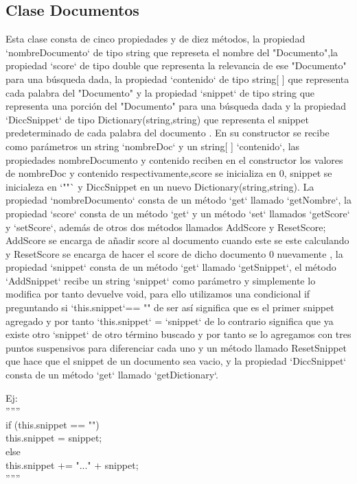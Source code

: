 \documentclass{article}
\begin{document}
\subsection{Clase Documentos}
Esta clase consta de cinco propiedades y de diez métodos, la propiedad `nombreDocumento` de tipo string que represeta el nombre del "Documento",la propiedad `score` de tipo double que representa la relevancia de ese "Documento" para una búsqueda dada, la propiedad `contenido` de tipo string[ ] que representa cada palabra del "Documento" y la propiedad `snippet` de tipo string que representa una porción del "Documento" para una búsqueda dada y la propiedad `DiccSnippet` de tipo Dictionary(string,string) que representa el snippet predeterminado de cada palabra del documento . En su constructor se recibe como parámetros un string `nombreDoc` y un string[ ] `contenido`, las propiedades nombreDocumento y contenido reciben en el constructor los valores de nombreDoc y contenido respectivamente,score se inicializa en 0, snippet se inicialeza en `""` y DiccSnippet en un nuevo Dictionary(string,string).
La propiedad `nombreDocumento` consta de un método `get` llamado `getNombre`, la propiedad `score` consta de un método `get` y un método `set` llamados `getScore` y `setScore`, además de otros dos métodos llamados AddScore y ResetScore;
AddScore se encarga de añadir score al documento cuando este se este calculando y ResetScore se encarga de hacer el score de dicho documento 0 nuevamente 
, la propiedad `snippet` consta de un método `get` llamado `getSnippet`, el método `AddSnippet` recibe un string `snippet` como parámetro y simplemente lo modifica por tanto devuelve void, para ello utilizamos una condicional if preguntando si `this.snippet`== "" de ser así significa 
que es el primer snippet agregado y por tanto `this.snippet` = `snippet` de lo contrario significa que ya existe otro `snippet` de otro término buscado y por tanto se lo agregamos con tres puntos suspensivos para diferenciar cada uno
 y un método llamado ResetSnippet que hace que el snippet de un documento sea vacio, y la propiedad `DiccSnippet` consta de un método `get` llamado `getDictionary`.

Ej:\\
''''''\\
if (this.snippet == "")\\
this.snippet = snippet;\\
else\\
this.snippet += "..." + snippet;\\
''''''
\end{document}
